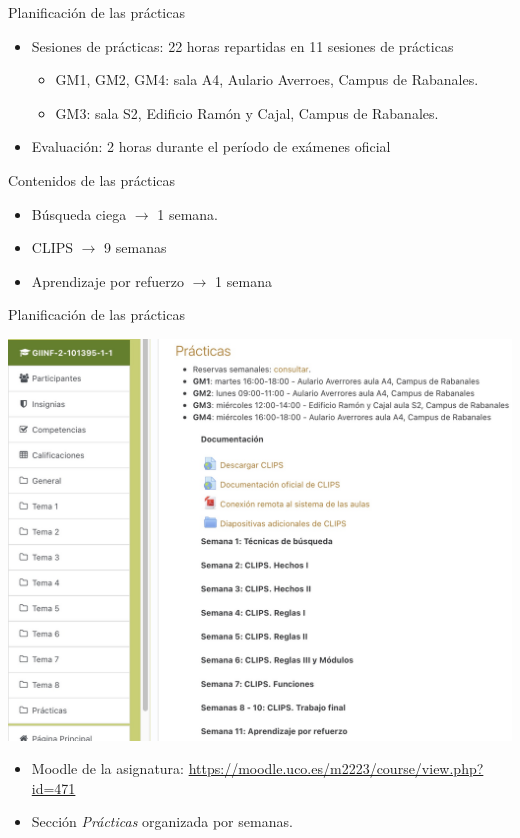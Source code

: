 \documentclass[usenames,dvipsnames,aspectratio=169]{beamer}
\begin{document}
\begin{frame}{Planificación de las prácticas}
    
    \begin{itemize}
        \item Sesiones de prácticas: 22 horas repartidas en 11 sesiones de prácticas
        \begin{itemize}
            \item GM1, GM2, GM4: sala A4, Aulario Averroes, Campus de Rabanales.
            \item GM3: sala S2, Edificio Ramón y Cajal, Campus de Rabanales.
        \end{itemize}
        
        \item Evaluación: 2 horas durante el período de exámenes oficial
    \end{itemize}
\end{frame}

\begin{frame}{Contenidos de las prácticas}
    \begin{itemize}
        \item Búsqueda ciega $\rightarrow$ 1 semana.
        \item CLIPS $\rightarrow$ 9 semanas
        \item Aprendizaje por refuerzo $\rightarrow$ 1 semana
    \end{itemize}
\end{frame}

\begin{frame}{Planificación de las prácticas}
	\begin{minipage}{.6\linewidth}
		\includegraphics[width=.9\linewidth]{graphics/moodle.jpg}
	\end{minipage}
	\begin{minipage}{.38\linewidth}
		\begin{itemize}
			\item Moodle de la asignatura: \url{https://moodle.uco.es/m2223/course/view.php?id=471}
			\item Sección \textit{Prácticas} organizada por semanas.
		\end{itemize}
	\end{minipage}
\end{frame}
\end{document}
